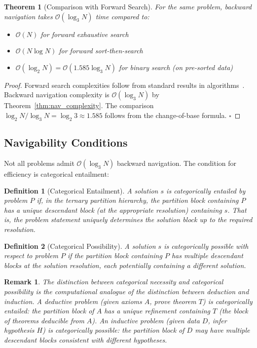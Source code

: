 \documentclass[12pt,twocolumn]{article}
\newtheorem{theorem}{Theorem}[section]
\newtheorem{definition}{Definition}[section]
\newtheorem{remark}{Remark}[section]
\begin{document}
\begin{theorem}[Comparison with Forward Search]
\label{thm:comparison}
For the same problem, backward navigation takes $\mathcal{O}(\log_3 N)$ time compared to:
\begin{itemize}
\item $\mathcal{O}(N)$ for forward exhaustive search
\item $\mathcal{O}(N \log N)$ for forward sort-then-search
\item $\mathcal{O}(\log_2 N) = \mathcal{O}(1.585 \log_3 N)$ for binary search (on pre-sorted data)
\end{itemize}
\end{theorem}

\begin{proof}
Forward search complexities follow from standard results in algorithms~\cite{cormen2009introduction}. Backward navigation complexity is $\mathcal{O}(\log_3 N)$ by Theorem~\ref{thm:nav_complexity}. The comparison $\log_2 N / \log_3 N = \log_2 3 \approx 1.585$ follows from the change-of-base formula. $\square$
\end{proof}

\subsection{Navigability Conditions}

Not all problems admit $\mathcal{O}(\log_3 N)$ backward navigation. The condition for efficiency is categorical entailment:

\begin{definition}[Categorical Entailment]
A solution $s$ is \emph{categorically entailed} by problem $P$ if, in the ternary partition hierarchy, the partition block containing $P$ has a unique descendant block (at the appropriate resolution) containing $s$. That is, the problem statement uniquely determines the solution block up to the required resolution.
\end{definition}

\begin{definition}[Categorical Possibility]
A solution $s$ is \emph{categorically possible} with respect to problem $P$ if the partition block containing $P$ has multiple descendant blocks at the solution resolution, each potentially containing a different solution.
\end{definition}

\begin{remark}
The distinction between categorical necessity and categorical possibility is the computational analogue of the distinction between deduction and induction. A deductive problem (given axioms $A$, prove theorem $T$) is categorically entailed: the partition block of $A$ has a unique refinement containing $T$ (the block of theorems deducible from $A$). An inductive problem (given data $D$, infer hypothesis $H$) is categorically possible: the partition block of $D$ may have multiple descendant blocks consistent with different hypotheses.
\end{remark}
\end{document}
